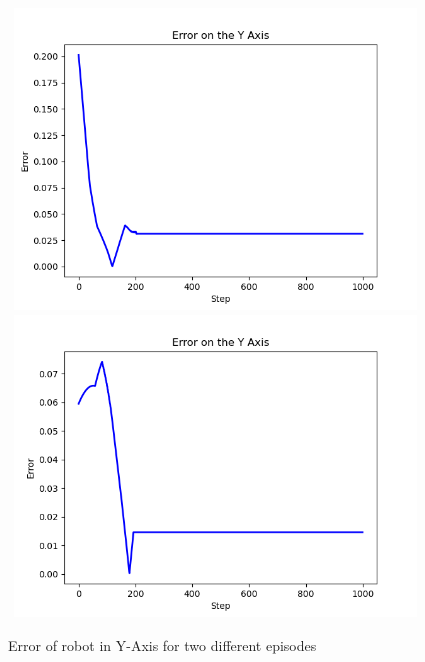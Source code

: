 \documentclass[12pt,twoside,a4]{mwbk}
\begin{document}
\begin{figure}[h!]
    \centering
    \includegraphics[width=11cm, height=8cm]{error_test_y.png}
    \includegraphics[width=11cm, height=8cm]{error_test_y_2.png}
    \caption{Error of robot in Y-Axis for two different episodes}
\end{figure}
\newpage
\end{document}
